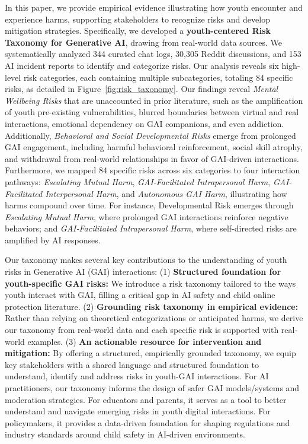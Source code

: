 In this paper, we provide empirical evidence illustrating how youth encounter and experience harms, supporting stakeholders to recognize risks and develop mitigation strategies. Specifically, we developed a \textbf{youth-centered Risk Taxonomy for Generative AI}, drawing from real-world data sources. We systematically analyzed 344 curated chat logs, 30,305 Reddit discussions, and 153 AI incident reports to identify and categorize risks. Our analysis reveals six high-level risk categories, each containing multiple subcategories, totaling 84 specific risks, as detailed in Figure~\ref{fig:risk_taxonomy}. Our findings reveal \textit{Mental Wellbeing Risks} that are unaccounted in prior literature, such as the amplification of youth pre-existing vulnerabilities, blurred boundaries between virtual and real interactions, emotional dependency on GAI companions, and even addiction. Additionally, \textit{Behavioral and Social Developmental Risks} emerge from prolonged GAI engagement, including harmful behavioral reinforcement, social skill atrophy, and withdrawal from real-world relationships in favor of GAI-driven interactions. Furthermore, we mapped 84 specific risks across six categories to four interaction pathways: \textit{Escalating Mutual Harm}, \textit{GAI-Facilitated Intrapersonal Harm}, \textit{GAI-Facilitated Interpersonal Harm}, and \textit{Autonomous GAI Harm}, illustrating how harms compound over time. For instance, Developmental Risk emerges through \textit{Escalating Mutual Harm}, where prolonged GAI interactions reinforce negative behaviors; and \textit{GAI-Facilitated Intrapersonal Harm}, where self-directed risks are amplified by AI responses. 


Our taxonomy makes several key contributions to the understanding of youth risks in Generative AI (GAI) interactions: (1) \textbf{Structured foundation for youth-specific GAI risks:} We introduce a risk taxonomy tailored to the ways youth interact with GAI, filling a critical gap in AI safety and child online protection literature.  (2) \textbf{Grounding risk taxonomy in empirical evidence:} Rather than relying on theoretical categorizations or anticipated harms, we derive our taxonomy from real-world data and each specific risk is supported with real-world examples. (3) \textbf{An actionable resource for intervention and mitigation:} By offering a structured, empirically grounded taxonomy, we equip key stakeholders with a shared language and structured foundation to understand, identify and address risks in youth-GAI interactions. For AI practitioners, our taxonomy informs the design of safer GAI models/systems and moderation strategies. For educators and parents, it serves as a tool to better understand and navigate emerging risks in youth digital interactions. For policymakers, it provides a data-driven foundation for shaping regulations and industry standards around child safety in AI-driven environments.

